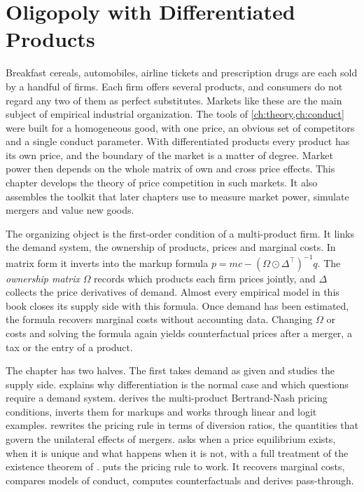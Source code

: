 \chapter{Oligopoly with Differentiated Products}\label{ch:diffprod}

Breakfast cereals, automobiles, airline tickets and prescription drugs are each sold by a handful of firms. Each
firm offers several products, and consumers do not regard any two of them as perfect substitutes. Markets like
these are the main subject of empirical industrial organization. The tools of \cref{ch:theory,ch:conduct} were
built for a homogeneous good, with one price, an obvious set of competitors and a single conduct parameter. With
differentiated products every product has its own price, and the boundary of the market is a matter of degree.
Market power then depends on the whole matrix of own and cross price effects. This chapter develops the theory of
price competition in such markets. It also assembles the toolkit that later chapters use to measure market power,
simulate mergers and value new goods.

The organizing object is the first-order condition of a multi-product firm. It links the demand system, the
ownership of products, prices and marginal costs. In matrix form it inverts into the markup formula
$p = mc - (\Omega \odot \Delta^\top)^{-1}q$. The \emph{ownership matrix} $\Omega$ records which products each firm
prices jointly, and $\Delta$ collects the price derivatives of demand. Almost every empirical model in this book
closes its supply side with this formula. Once demand has been estimated, the formula recovers marginal costs
without accounting data. Changing $\Omega$ or costs and solving the formula again yields counterfactual prices
after a merger, a tax or the entry of a product.

The chapter has two halves. The first takes demand as given and studies the supply side. 
explains why differentiation is the normal case and which questions require a demand system.
 derives the multi-product Bertrand-Nash pricing conditions, inverts them for markups and
works through linear and logit examples.  rewrites the pricing rule in terms of diversion
ratios, the quantities that govern the unilateral effects of mergers.  asks when a price
equilibrium exists, when it is unique and what happens when it is not, with a full treatment of the existence
theorem of \citet{CaplinNalebuff1991}.  puts the pricing rule to work. It recovers marginal
costs, compares models of conduct, computes counterfactuals and derives pass-through.

